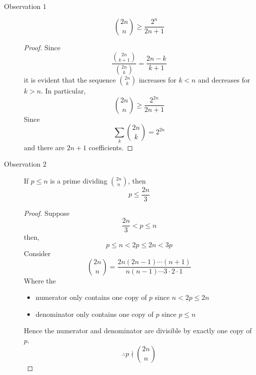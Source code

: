 \documentclass{article}
\begin{document}
\begin{description}
    \item[Observation $1$]
    \[
        \binom{2n}{n} \geq \frac{2^n}{2n + 1} \tag{1}
    \]
    \begin{proof}
        Since
        \[
            \frac{\binom{2n}{k + 1}}{\binom{2n}{k}} = \frac{2n - k}{k + 1}  
        \]
        it is evident that the sequence $\binom{2n}{k}$ increases for $k < n$ and decreases for $k > n$.
        In particular,
        \[
            \binom{2n}{n} \geq \frac{2^{2n}}{2n + 1}  
        \]
        Since
        \[
            \sum_{k}{\binom{2n}{k}} = 2^{2n}
        \]
        and there are $2n + 1$ coefficients.
    \end{proof}
    
    \item[Observation $2$] If $p \leq n$ is a prime dividing $\binom{2n}{n}$, then
    \[
        p \leq \frac{2n}{3} \tag{2}  
    \]
    \begin{proof}
        Suppose
        \[
            \frac{2n}{3} < p \leq n  
        \]
        then,
        \[
            p \leq n < 2p \leq 2n < 3p  
        \]
        Consider
        \[
            \binom{2n}{n} = \frac{2n (2n - 1)\cdots(n + 1)}{n (n-1) \cdots 3 \cdot 2 \cdot 1}  
        \]
        Where the 
        \begin{itemize}
            \item numerator only contains one copy of $p$ since $n < 2p \leq 2n$
            \item denominator only contains one copy of $p$ since $p \leq n$
        \end{itemize}
        Hence the numerator and denominator are divisible by exactly one copy of $p$.
        \[
            \therefore p \nmid \binom{2n}{n}  
        \]
    \end{proof}


\end{description}
\end{document}

